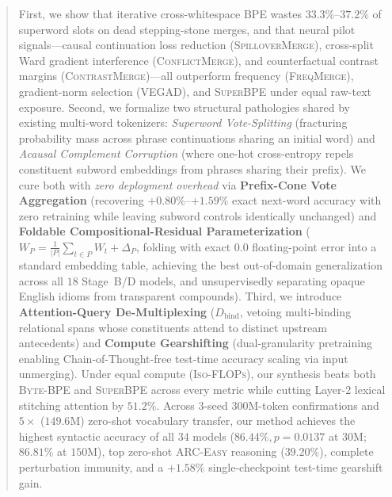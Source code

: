 \documentclass[11pt,a4paper]{article}
\begin{document}
\begin{abstract}
First, we show that iterative cross-whitespace BPE wastes $33.3\%$--$37.2\%$ of superword slots on dead stepping-stone merges, and that neural pilot signals---causal continuation loss reduction (\textsc{SpilloverMerge}), cross-split Ward gradient interference (\textsc{ConflictMerge}), and counterfactual contrast margins (\textsc{ContrastMerge})---all outperform frequency (\textsc{FreqMerge}), gradient-norm selection (\textsc{VEGAD}), and \textsc{SuperBPE} under equal raw-text exposure. Second, we formalize two structural pathologies shared by existing multi-word tokenizers: \emph{Superword Vote-Splitting} (fracturing probability mass across phrase continuations sharing an initial word) and \emph{Acausal Complement Corruption} (where one-hot cross-entropy repels constituent subword embeddings from phrases sharing their prefix). We cure both with \emph{zero deployment overhead} via \textbf{Prefix-Cone Vote Aggregation} (recovering $+0.80\%$--$+1.59\%$ exact next-word accuracy with zero retraining while leaving subword controls identically unchanged) and \textbf{Foldable Compositional-Residual Parameterization} ($W_P = \frac{1}{|P|}\sum_{t\in P} W_t + \Delta_P$, folding with exact $0.0$ floating-point error into a standard embedding table, achieving the best out-of-domain generalization across all $18$ Stage~B/D models, and unsupervisedly separating opaque English idioms from transparent compounds). Third, we introduce \textbf{Attention-Query De-Multiplexing} ($D_{\text{bind}}$, vetoing multi-binding relational spans whose constituents attend to distinct upstream antecedents) and \textbf{Compute Gearshifting} (dual-granularity pretraining enabling Chain-of-Thought-free test-time accuracy scaling via input unmerging). Under equal compute (\textsc{Iso-FLOPs}), our synthesis beats both \textsc{Byte-BPE} and \textsc{SuperBPE} across every metric while cutting Layer-2 lexical stitching attention by $51.2\%$. Across $3$-seed $300\text{M}$-token confirmations and $5\times$ ($149.6\text{M}$) zero-shot vocabulary transfer, our method achieves the highest syntactic accuracy of all $34$ models ($86.44\%, p=0.0137$ at $30\text{M}$; $86.81\%$ at $150\text{M}$), top zero-shot \textsc{ARC-Easy} reasoning ($39.20\%$), complete perturbation immunity, and a $+1.58\%$ single-checkpoint test-time gearshift gain.
\end{abstract}
\end{document}
